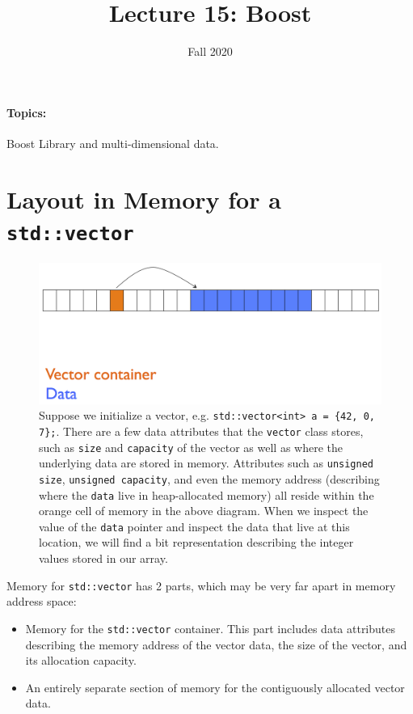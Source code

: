 \documentclass[12pt,letterpaper,twoside]{article}
\begin{document}
\title{Lecture 15: Boost\vspace{-5ex}}
\date{Fall 2020}
\maketitle

{\footnotesize
\paragraph{Topics:} Boost Library and multi-dimensional data.
}
\vspace{-3ex}

\section{Layout in Memory for a \texttt{std::vector}}

\begin{figure}[h]
\centering
\includegraphics[scale=0.5]{fig/vector-memory.png}
\caption{\footnotesize 
  Suppose we initialize a vector, e.g. \texttt{std::vector<int> a = \{42, 0, 7\};}.
  There are a few data attributes that the \texttt{vector} class stores, such as 
  \texttt{size} and \texttt{capacity} of the vector as well as where the underlying data are stored
  in memory. Attributes such as \texttt{unsigned size}, \texttt{unsigned capacity}, and even the 
  memory address (describing where the \texttt{data} live in heap-allocated memory) 
  all reside within the orange cell of memory in the above diagram. When we inspect the value 
  of the \texttt{data} pointer and inspect the data that live at this location, we will find a bit 
  representation describing the integer values stored in our array.}
\end{figure}

Memory for \texttt{std::vector} has 2 parts, which may be very far apart in memory address space:
\begin{itemize}
\item
  Memory for the \texttt{std::vector} container. This part
  includes data attributes describing the memory address of the vector data, the
  size of the vector, and its allocation capacity.
\item
  An entirely separate section of memory for the contiguously allocated vector data.
\end{itemize}
\end{document}
